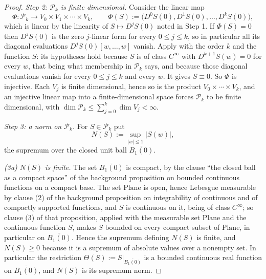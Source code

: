 \begin{proof}
\medskip\noindent\emph{Step 2: $\mathcal{P}_k$ is finite dimensional.}
Consider the linear map
\[
  \Phi\colon\mathcal{P}_k\to V_0\times V_1\times\cdots\times V_k,\qquad
  \Phi(S):=\bigl(D^{0}S(0),D^{1}S(0),\ldots,D^{k}S(0)\bigr),
\]
which is linear by the linearity of $S\mapsto D^{j}S(0)$ noted in Step 1.  If $\Phi(S)=0$ then
$D^{j}S(0)$ is the zero $j$-linear form for every $0\le j\le k$, so in particular all its
diagonal evaluations $D^{j}S(0)[w,\ldots,w]$ vanish.  Apply
 with the order $k$ and the function $S$: its hypotheses hold
because $S$ is of class $C^{\infty}$ with $D^{k+1}S(w)=0$ for every $w$, that being what
membership in $\mathcal{P}_k$ says, and because those diagonal evaluations vanish for every
$0\le j\le k$ and every $w$.  It gives $S\equiv0$.  So $\Phi$ is injective.  Each $V_j$ is finite dimensional, hence so is the product
$V_0\times\cdots\times V_k$, and an injective linear map into a finite-dimensional space forces
$\mathcal{P}_k$ to be finite dimensional, with
$\dim\mathcal{P}_k\le\sum_{j=0}^{k}\dim V_j<\infty$.

\medskip\noindent\emph{Step 3: a norm on $\mathcal{P}_k$.}
For $S\in\mathcal{P}_k$ put
\[
  N(S):=\sup_{\lvert w\rvert\le1}\lvert S(w)\rvert ,
\]
the supremum over the closed unit ball $\overline{B_1(0)}$.

\emph{(3a) $N(S)$ is finite.}  The set $\overline{B_1(0)}$ is compact, by the clause ``the closed
ball as a compact space'' of the background proposition on bounded continuous functions on a
compact base.  The set $\mathrm{Plane}$ is open, hence Lebesgue measurable by clause (2) of the
background proposition on integrability of continuous and of compactly supported functions, and
$S$ is continuous on it, being of class $C^{\infty}$; so clause (3) of that proposition, applied
with the measurable set $\mathrm{Plane}$ and the continuous function $S$, makes $S$ bounded on
every compact subset of $\mathrm{Plane}$, in particular on $\overline{B_1(0)}$.  Hence
the supremum defining $N(S)$ is finite, and $N(S)\ge0$ because it is a supremum of absolute
values over a nonempty set.  In particular the restriction
$\Theta(S):=\left.S\right|_{\overline{B_1(0)}}$ is a bounded continuous real function on
$\overline{B_1(0)}$, and $N(S)$ is its supremum norm.


\end{proof}
